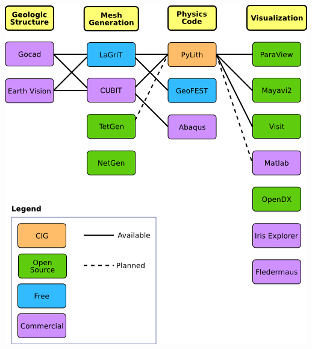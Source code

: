 \documentclass[pdftex,cig,slideColor]{pp4slides}
\begin{document}
  \vfill
  \begin{center}
    \includegraphics[scale=1.15]{figs/workflow}
  \end{center}

  \summary{}
\end{document}
